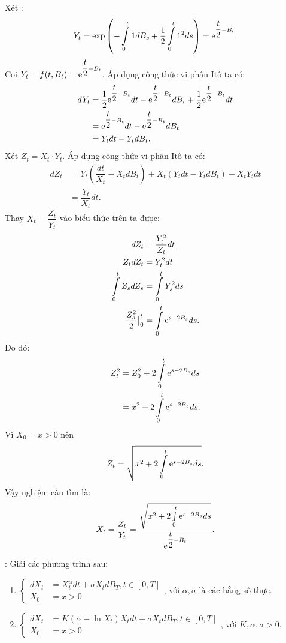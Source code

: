 \begin{sol*}
    Xét \qtnn: \[Y_t = \exp \left(-\int\limits_0^t 1 dB_s + \dfrac{1}{2} \int\limits_0^t 1^2 ds \right) = \mathrm{e}^{\dfrac{t}{2} - B_t}. \]
    Coi $Y_t = f(t,B_t) = \mathrm{e}^{\dfrac{t}{2} - B_t}$. Áp dụng công thức vi phân Itô ta có:
    \begin{align*}
        dY_t &= \dfrac{1}{2} \mathrm{e}^{\dfrac{t}{2} - B_t} dt - \mathrm{e}^{\dfrac{t}{2} - B_t} dB_t + \dfrac{1}{2} \mathrm{e}^{\dfrac{t}{2} - B_t} dt \\
        &= \mathrm{e}^{\dfrac{t}{2} - B_t} dt - \mathrm{e}^{\dfrac{t}{2} - B_t} dB_t \\
        &= Y_t dt - Y_t dB_t.
    \end{align*}
    Xét $Z_t = X_t \cdot Y_t$. Áp dụng công thức vi phân Itô ta có:
    \begin{align*}
        dZ_t &= Y_t \left(\dfrac{dt}{X_t} + X_t dB_t \right) + X_t (Y_t dt - Y_t dB_t) - X_t Y_t dt\\
        &= \dfrac{Y_t}{X_t} dt.
    \end{align*}
    Thay $X_t = \dfrac{Z_t}{Y_t}$ vào biểu thức trên ta được:
    \begin{align*}
         dZ_t & = \dfrac{Y_t^2}{Z_t} dt \\
         Z_t dZ_t &= Y_t^2 dt \\
         \int\limits_0^t Z_s dZ_s &= \int\limits_0^t Y_s^2 ds \\        
         \dfrac{Z_s^2}{2} \big|_0^t &= \int\limits_0^t \mathrm{e}^{s-2B_s}ds.
    \end{align*}
    Do đó:
    \begin{align*}
        Z_t^2 &= Z_0^2 + 2\int\limits_0^t \mathrm{e}^{s-2B_s}ds\\
        &= x^2 + 2\int\limits_0^t \mathrm{e}^{s-2B_s}ds.
    \end{align*}
    Vì $X_0 = x>0$ nên \[Z_t = \sqrt{x^2 + 2\int\limits_0^t \mathrm{e}^{s-2B_s}ds}.\]
    Vậy nghiệm cần tìm là:
    \[X_t = \dfrac{Z_t}{Y_t} = \dfrac{\sqrt{x^2 + 2\int\limits_0^t \mathrm{e}^{s-2B_s}ds}}{\mathrm{e}^{\dfrac{t}{2} - B_t}}.\]
\end{sol*}
\examplename: Giải các phương trình sau:
\begin{enumerate}
    \item $\begin{cases}
        dX_t &= X_t^\alpha dt + \sigma X_t dB_T, t \in [0,T] \\
        X_0 &= x > 0
    \end{cases}$, với $\alpha, \sigma$ là các hằng số thực.
    \item $\begin{cases}
        dX_t &= K(\alpha - \ln X_t)X_t dt + \sigma X_t dB_T, t \in [0,T] \\
        X_0 &= x > 0
    \end{cases}$, với $K, \alpha, \sigma > 0$.
\end{enumerate}
